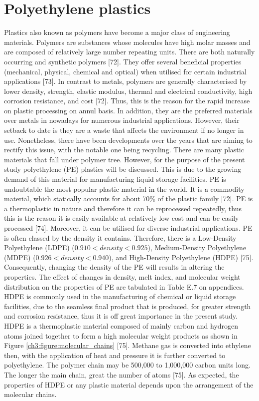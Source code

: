 \documentclass[12pt]{report}
\begin{document}
\section{Polyethylene plastics}
Plastics also known as polymers have become a major class of engineering materials. Polymers are substances whose molecules have high molar masses and are composed of relatively large number repeating units. There are both naturally occurring and synthetic polymers [72]. They offer several beneficial properties (mechanical, physical, chemical and optical) when utilised for certain industrial applications [73]. In contrast to metals, polymers are generally characterised by lower density, strength, elastic modulus, thermal and electrical conductivity, high corrosion resistance, and cost [72]. Thus, this is the reason for the rapid increase on plastic processing on annul basis. In addition, they are the preferred materials over metals in nowadays for numerous industrial applications. However, their setback to date is they are a waste that affects the environment if no longer in use. Nonetheless, there have been developments over the years that are aiming to rectify this issue, with the notable one being recycling.  
There are many plastic materials that fall under polymer tree. However, for the purpose of the present study polyethylene (PE) plastics will be discussed. This is due to the growing demand of this material for manufacturing liquid storage facilities. PE is undoubtable the most popular plastic material in the world. It is a commodity material, which statically accounts for about 70\% of the plastic family [72].  PE is a thermoplastic in nature and therefore it can be reprocessed repeatedly, thus this is the reason it is easily available at relatively low cost and can be easily processed [74]. Moreover, it can be utilised for diverse industrial applications. 
PE is often classed by the density it contains. Therefore, there is a Low-Density Polyethylene (LDPE) ($0.910 < density < 0.925$), Medium-Density Polyethylene (MDPE) ($0.926 < density < 0.940$), and High-Density Polyethylene (HDPE) [75]. Consequently, changing the density of the PE will results in altering the properties. The effect of changes in density, melt index, and molecular weight distribution on the properties of PE are tabulated in Table E.7 on appendices. 
HDPE is commonly used in the manufacturing of chemical or liquid storage facilities, due to the seamless final product that is produced, for greater strength and corrosion resistance, thus it is off great importance in the present study. HDPE is a thermoplastic material composed of mainly carbon and hydrogen atoms joined together to form a high molecular weight products as shown in Figure \ref{ch3:figure:molecular_chains} [75]. Methane gas is converted into ethylene then, with the application of heat and pressure it is further converted to polyethylene. The polymer chain may be 500,000 to 1,000,000 carbon units long. The longer the main chain, great the number of atoms [75]. As expected, the properties of HDPE or any plastic material depends upon the arrangement of the molecular chains. 
               
\end{document}
